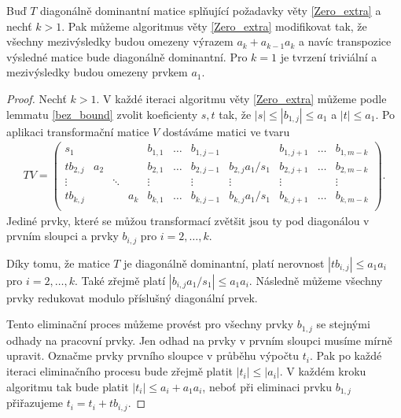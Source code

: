 \begin{lem} \label{Zero_extra_modified}
Buď $ T $ diagonálně dominantní matice splňující požadavky věty \ref{Zero_extra} 
a nechť $ k > 1 $.
Pak můžeme algoritmus věty \ref{Zero_extra} modifikovat tak, že všechny
mezivýsledky budou omezeny výrazem $ a_k + a_{k - 1} a_k $ 
a navíc transpozice výsledné matice bude diagonálně dominantní.
Pro $ k = 1 $ je tvrzení triviální a mezivýsledky budou omezeny prvkem $ a_1 $.
\end{lem}
\begin{proof}
Nechť $ k > 1 $. V každé iteraci algoritmu věty \ref{Zero_extra} můžeme podle lemmatu
\ref{bez_bound} zvolit koeficienty $ s, t $ tak, že $ |s| \leq |b_{1,j}| \leq a_1$
a $ |t| \leq a_1 $. Po aplikaci transformační matice $ V $ dostáváme matici ve
tvaru
\begin{align*}
TV =
    \left(
    \begin{array}{cccc|ccccccc}
        s_1      &     &        &     & b_{1,1} & \hdots & b_{1,j-1} &                   & b_{1,j+1} & \hdots & b_{1,m-k} \\
        tb_{2,j} & a_2 &        &     & b_{2,1} & \hdots & b_{2,j-1} & b_{2,j} a_1 / s_1 & b_{2,j+1} & \hdots & b_{2,m-k} \\
        \vdots   &     & \ddots &     & \vdots  &        & \vdots    & \vdots            & \vdots    &        & \vdots    \\
        tb_{k,j} &     &        & a_k & b_{k,1} & \hdots & b_{k,j-1} & b_{k,j} a_1 / s_1 & b_{k,j+1} & \hdots & b_{k,m-k} \\
    \end{array}
    \right).
\end{align*}
Jediné prvky, které se můžou transformací zvětšit jsou ty pod diagonálou v 
prvním sloupci a prvky $ b_{i,j} $ pro $ i = 2,\dots,k $.

Díky tomu, že matice $ T $ je diagonálně dominantní, platí nerovnost
$ |tb_{i,j}| \leq a_1 a_i $ pro $ i = 2,\dots,k $. Také zřejmě platí
$ | b_{i,j} a_1 / s_1 | \leq a_1 a_i $. Následně můžeme všechny prvky redukovat
modulo příslušný diagonální prvek.

Tento eliminační proces můžeme provést pro všechny prvky $ b_{1, j} $ se stejnými
odhady na pracovní prvky. Jen odhad na prvky v prvním sloupci musíme mírně upravit.
Označme prvky prvního sloupce v průběhu výpočtu $ t_i $. Pak po každé iteraci
eliminačního procesu bude zřejmě platit $ |t_i| \leq |a_i| $. V každém kroku
algoritmu tak bude platit $ |t_i| \leq a_i + a_1 a_i $, neboť při eliminaci
prvku $ b_{1,j} $ přiřazujeme $ t_i = t_i + tb_{i,j} $.


\end{proof}
